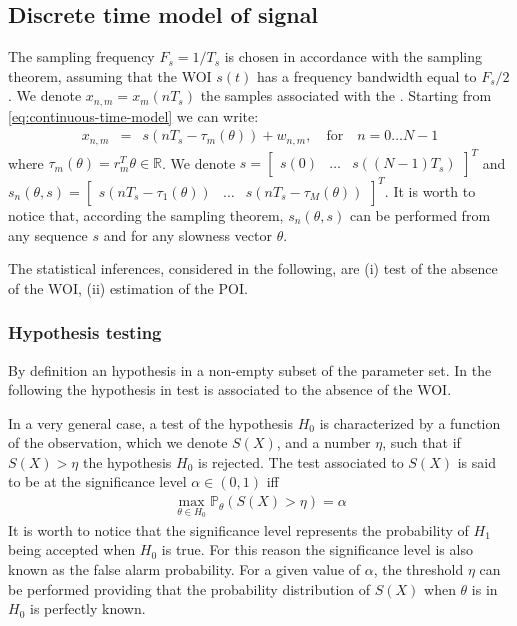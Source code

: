 \documentclass[graybox]{svmult/styles/svmult}
\begin{document}
  \subsection{Discrete time model of signal}
  The sampling frequency $F_{s}=1/T_{s}$ is chosen in accordance with the sampling theorem, assuming that the WOI $s(t)$ has a frequency bandwidth equal to $F_{s}/2$. We denote $x_{n,m}=x_{m}(nT_{s})$ the samples associated with the .  Starting from \eqref{eq:continuous-time-model} we can write:
 \begin{eqnarray}
 \label{eq:discrete-time-model}
 x_{n,m}&=&s(nT_{s}-\tau_{m}(\theta))+w_{n,m},\quad \mathrm{for}\quad n=0\ldots N-1
 \end{eqnarray}
where $\tau_{m}(\theta)=r_{m}^{T}\theta\in\mathds{R}$. We denote $s=\begin{bmatrix} s(0)&\ldots&  s((N-1)T_{s}) \end{bmatrix}^{T}$ and  $s_{n}(\theta,s)=\begin{bmatrix} s(nT_{s}-\tau_{1}(\theta))&\ldots&  s(nT_{s}-\tau_{M}(\theta)) \end{bmatrix}^{T}$.  It is worth to notice that, according the sampling theorem, $s_{n}(\theta,s)$ can be performed from any sequence $s$ and for any  slowness vector  $\theta$. 

The statistical inferences, considered in the following, are (i) test of the absence of the WOI, (ii) estimation of the POI.

\subsubsection{Hypothesis testing}

By definition an hypothesis in a non-empty subset of the parameter set.  In the following the hypothesis in test is associated to the absence of the WOI.

In a very general case, a test of the hypothesis $H_{0}$ is  characterized by a function of the observation, which we denote $S(X)$, and a number $\eta$, such that if $S(X)>\eta$ the hypothesis $H_{0}$ is rejected. The test associated to $S(X)$ is said to be at the significance level $\alpha\in(0,1)$ iff 
 \begin{eqnarray}
    \label{eq:test-niveau}
    \max_{\theta\in H_{0}}  \mathds{P}_{\theta}(S(X)>\eta)= \alpha
\end{eqnarray}
It is worth to notice that the significance level represents the probability of $H_{1}$ being accepted when $H_{0}$ is true. For this reason the significance level is also known as the false alarm probability. For a given value of $\alpha$, the threshold $\eta$ can be performed  providing that the probability distribution of $S(X)$ when $\theta$ is in $H_{0}$ is perfectly known.
\end{document}
